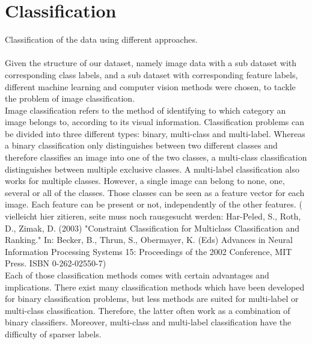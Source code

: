 \section{Classification}

Classification of the data using different approaches. \\ \\

Given the structure of our dataset, namely image data with a sub dataset with corresponding class labels, and a sub dataset with corresponding feature labels, different machine learning and computer vision methods were chosen, to tackle the problem of image classification. \\

Image classification refers to the method of identifying to which category an image belongs to, according to its visual information.  Classification problems can be divided into three different types: binary, multi-class and multi-label. Whereas a binary classification only distinguishes between two different classes and therefore classifies an image into one of the two classes, a multi-class classification distinguishes between multiple exclusive classes. A multi-label classification also works for multiple classes. However, a single image can belong to none, one, several or all of the classes. Those classes can be seen as a feature vector for each image. Each feature can be present or not, independently of the other features. ( vielleicht hier zitieren, seite muss noch rausgesucht werden: Har-Peled, S., Roth, D., Zimak, D. (2003) "Constraint Classification for Multiclass Classification and Ranking." In: Becker, B., Thrun, S., Obermayer, K. (Eds) Advances in Neural Information Processing Systems 15: Proceedings of the 2002 Conference, MIT Press. ISBN 0-262-02550-7) \\

Each of those classification methods comes with certain advantages and implications.
There exist many classification methods which have been developed for binary classification problems, but less methods are suited for multi-label or multi-class classification. Therefore, the latter often work as a combination of binary classifiers. Moreover, multi-class and multi-label classification have the difficulty of sparser labels. \\

